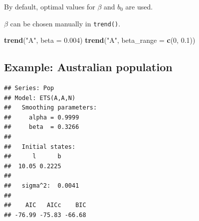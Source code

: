 \documentclass[]{book}
\newenvironment{Shaded}{\begin{snugshade}}{\end{snugshade}}
\newcommand{\DataTypeTok}[1]{\textcolor[rgb]{0.13,0.29,0.53}{#1}}
\newcommand{\DecValTok}[1]{\textcolor[rgb]{0.00,0.00,0.81}{#1}}
\newcommand{\FloatTok}[1]{\textcolor[rgb]{0.00,0.00,0.81}{#1}}
\newcommand{\KeywordTok}[1]{\textcolor[rgb]{0.13,0.29,0.53}{\textbf{#1}}}
\newcommand{\NormalTok}[1]{#1}
\newcommand{\OperatorTok}[1]{\textcolor[rgb]{0.81,0.36,0.00}{\textbf{#1}}}
\newcommand{\StringTok}[1]{\textcolor[rgb]{0.31,0.60,0.02}{#1}}
\begin{document}
By default, optimal values for \(\beta\) and \(b_0\) are used.

\(\beta\) can be chosen manually in \texttt{trend()}.

\begin{Shaded}
\begin{Highlighting}[]
\KeywordTok{trend}\NormalTok{(}\StringTok{"A"}\NormalTok{, }\DataTypeTok{beta =} \FloatTok{0.004}\NormalTok{)}
\KeywordTok{trend}\NormalTok{(}\StringTok{"A"}\NormalTok{, }\DataTypeTok{beta_range =} \KeywordTok{c}\NormalTok{(}\DecValTok{0}\NormalTok{, }\FloatTok{0.1}\NormalTok{))}
\end{Highlighting}
\end{Shaded}

\hypertarget{example-australian-population}{%
\subsection{Example: Australian population}\label{example-australian-population}}

\begin{Shaded}
\end{Shaded}

\begin{verbatim}
## Series: Pop 
## Model: ETS(A,A,N) 
##   Smoothing parameters:
##     alpha = 0.9999 
##     beta  = 0.3266 
## 
##   Initial states:
##      l      b
##  10.05 0.2225
## 
##   sigma^2:  0.0041
## 
##    AIC   AICc    BIC 
## -76.99 -75.83 -66.68
\end{verbatim}

\begin{Shaded}
\end{Shaded}
\end{document}
